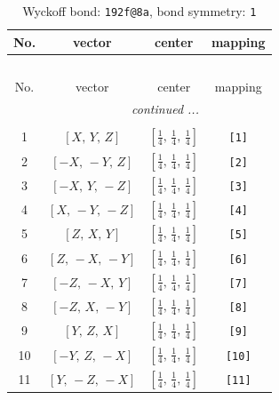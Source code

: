 \documentclass[fleqn,8pt]{jsarticle}
\begin{document}
\begin{longtable}{cccc}
\caption{Wyckoff bond: {\tt 192f@8a}, bond symmetry: {\tt 1}}
 \\
 \hline \hline
No. & vector & center & mapping \\ \hline \endfirsthead

\multicolumn{3}{l}{\tablename\ \thetable{}} \\
 \hline \hline
No. & vector & center & mapping \\ \hline \endhead

 \hline \hline
\multicolumn{3}{r}{\footnotesize\it continued ...} \\ \endfoot

 \hline \hline
\multicolumn{3}{r}{} \\ \endlastfoot

1 & $\left[ X,\, Y,\, Z \right]$ & $\left[ \frac{1}{4},\, \frac{1}{4},\, \frac{1}{4} \right]$ & {\tt [1]} \\ \hline
2 & $\left[ - X,\, - Y,\, Z \right]$ & $\left[ \frac{1}{4},\, \frac{1}{4},\, \frac{1}{4} \right]$ & {\tt [2]} \\ \hline
3 & $\left[ - X,\, Y,\, - Z \right]$ & $\left[ \frac{1}{4},\, \frac{1}{4},\, \frac{1}{4} \right]$ & {\tt [3]} \\ \hline
4 & $\left[ X,\, - Y,\, - Z \right]$ & $\left[ \frac{1}{4},\, \frac{1}{4},\, \frac{1}{4} \right]$ & {\tt [4]} \\ \hline
5 & $\left[ Z,\, X,\, Y \right]$ & $\left[ \frac{1}{4},\, \frac{1}{4},\, \frac{1}{4} \right]$ & {\tt [5]} \\ \hline
6 & $\left[ Z,\, - X,\, - Y \right]$ & $\left[ \frac{1}{4},\, \frac{1}{4},\, \frac{1}{4} \right]$ & {\tt [6]} \\ \hline
7 & $\left[ - Z,\, - X,\, Y \right]$ & $\left[ \frac{1}{4},\, \frac{1}{4},\, \frac{1}{4} \right]$ & {\tt [7]} \\ \hline
8 & $\left[ - Z,\, X,\, - Y \right]$ & $\left[ \frac{1}{4},\, \frac{1}{4},\, \frac{1}{4} \right]$ & {\tt [8]} \\ \hline
9 & $\left[ Y,\, Z,\, X \right]$ & $\left[ \frac{1}{4},\, \frac{1}{4},\, \frac{1}{4} \right]$ & {\tt [9]} \\ \hline
10 & $\left[ - Y,\, Z,\, - X \right]$ & $\left[ \frac{1}{4},\, \frac{1}{4},\, \frac{1}{4} \right]$ & {\tt [10]} \\ \hline
11 & $\left[ Y,\, - Z,\, - X \right]$ & $\left[ \frac{1}{4},\, \frac{1}{4},\, \frac{1}{4} \right]$ & {\tt [11]} \\ \hline

\end{longtable}
\end{document}
